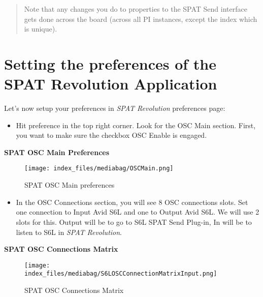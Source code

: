 \documentclass[
  letterpaper,
  DIV=11,
  numbers=noendperiod]{scrreport}
\providecommand{\tightlist}{%
  \setlength{\itemsep}{0pt}\setlength{\parskip}{0pt}}\usepackage{longtable,booktabs,array}
\begin{document}
\begin{quote}
Note that any changes you do to properties to the SPAT Send interface
gets done across the board (across all PI instances, except the index
which is unique).
\end{quote}

\hypertarget{setting-the-preferences-of-the-spat-revolution-application}{%
\section{Setting the preferences of the SPAT Revolution
Application}\label{setting-the-preferences-of-the-spat-revolution-application}}

Let's now setup your preferences in \emph{SPAT Revolution} preferences
page:

\begin{itemize}
\tightlist
\item
  Hit preference in the top right corner. Look for the OSC Main section.
  First, you want to make sure the checkbox OSC Enable is engaged.
\end{itemize}

\textbf{SPAT OSC Main Preferences}

\begin{figure}

{\centering \texttt{[image: index\_files/mediabag/OSCMain.png]}

}

\caption{SPAT OSC Main preferences}

\end{figure}

\begin{itemize}
\tightlist
\item
  In the OSC Connections section, you will see 8 OSC connections slots.
  Set one connection to Input Avid S6L and one to Output Avid S6L. We
  will use 2 slots for this. Output will be to go to S6L SPAT Send
  Plug-in, In will be to listen to S6L in \emph{SPAT Revolution}.
\end{itemize}

\textbf{SPAT OSC Connections Matrix}

\begin{figure}

{\centering \texttt{[image: index\_files/mediabag/S6LOSCConnectionMatrixInput.png]}

}

\caption{SPAT OSC Connections Matrix}

\end{figure}
\end{document}
